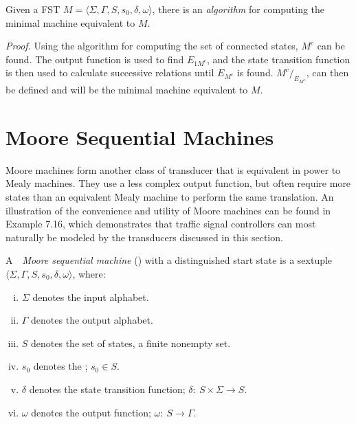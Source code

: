 \begin{cor}\label{cor-7.7}
Given a FST $M=\langle\Sigma,\Gamma,S,s_0,\delta,\omega\rangle$, there is an
\emph{algorithm} for computing the minimal machine equivalent to $M$.

\emph{Proof.} Using the algorithm for computing the set of connected states,
$M^c$ can be found. The output function is used to find $E_{1M^c}$, and the
state transition function is then used to calculate successive relations until
$E_{M^c}$ is found. $M^c/_{E_{M^c}}$, can then be defined and will be the
minimal machine equivalent to $M$.
\end{cor}

\section{Moore Sequential Machines}\label{sec-7.3}

Moore machines form another class of transducer that is equivalent in power to
Mealy machines. They use a less complex output function, but often require more
states than an equivalent Mealy machine to perform the same translation. An
illustration of the convenience and utility of Moore machines can be found in
Example 7.16, which demonstrates that traffic signal controllers can most
naturally be modeled by the transducers discussed in this section.

\begin{dfn}\label{dfn-7.16}
A\ \ \emph{Moore sequential machine} () with a distinguished
start state is a sextuple\linebreak $\langle\Sigma,\Gamma,S,s_0,\delta,\omega\rangle$,
where:
\begin{enumerate}[i.]
\item $\Sigma$ denotes the input alphabet.
\item $\Gamma$ denotes the output alphabet.
\item $S$ denotes the set of states, a finite nonempty set.
\item $s_0$ denotes the \emph{}; $s_0 \in S$.
\item $\delta$ denotes the state transition function; $\delta$$:\ S \times \Sigma
	\rightarrow S$.
\item $\omega$ denotes the output function; $\omega$$:\ S \rightarrow \Gamma$.
\end{enumerate}
\end{dfn}

